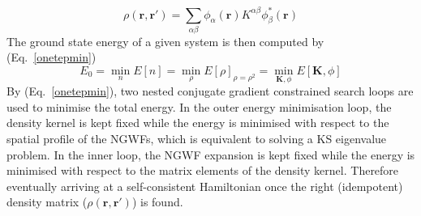 %
\begin{equation} \label{ngwf}
\rho(\mathbf{r, r'}) = \sum_{\alpha \beta} \phi_{\alpha} (\mathbf{r}) K^{\alpha \beta} \phi_{\beta}^*(\mathbf{r})
\end{equation}
%
The ground state energy of a given system is then computed by (Eq.~\ref{onetepmin})
%
\begin{equation} \label{onetepmin}
E_0 = \min_n E[n] = \min_\rho E[\rho]_{\rho = \rho^2} = \min_{\mathbf{K}, \phi} E[\mathbf{K}, \phi]
\end{equation}
%
By (Eq.~\ref{onetepmin}), two nested conjugate gradient constrained search loops are used to minimise the total energy. In the outer energy minimisation loop, the density kernel is kept fixed while the energy is minimised with respect to the spatial profile of the NGWFs, which is equivalent to solving a KS eigenvalue problem. In the inner loop, the NGWF expansion is kept fixed while the energy is minimised with respect to the matrix elements of the density kernel. Therefore eventually arriving at a self-consistent Hamiltonian once the right (idempotent) density matrix ($\rho(\mathbf{r, r'})$) is found. %
%
%

